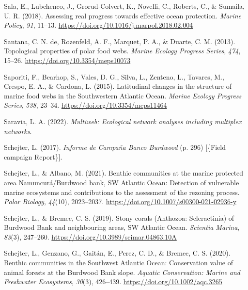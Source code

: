 \documentclass[preprint, 3p,
authoryear]{elsarticle} %
\newlength{\cslhangindent}
\newlength{\cslentryspacingunit} %
\newenvironment{CSLReferences}[2] %
 {%
  \setlength{\parindent}{0pt}
  \ifodd #1
  \let\oldpar\par
  \def\par{\hangindent=\cslhangindent\oldpar}
  \fi
  \setlength{\parskip}{#2\cslentryspacingunit}
 }%
 {}
\begin{document}
\begin{CSLReferences}{1}{0}
\leavevmode{}%
Sala, E., Lubchenco, J., Grorud-Colvert, K., Novelli, C., Roberts, C.,
\& Sumaila, U. R. (2018). Assessing real progress towards effective
ocean protection. \emph{Marine Policy}, \emph{91}, 11--13.
\url{https://doi.org/10.1016/j.marpol.2018.02.004}

\leavevmode{}%
Santana, C. N. de, Rozenfeld, A. F., Marquet, P. A., \& Duarte, C. M.
(2013). Topological properties of polar food webs. \emph{Marine Ecology
Progress Series}, \emph{474}, 15--26.
\url{https://doi.org/10.3354/meps10073}

\leavevmode{}%
Saporiti, F., Bearhop, S., Vales, D. G., Silva, L., Zenteno, L.,
Tavares, M., Crespo, E. A., \& Cardona, L. (2015). Latitudinal changes
in the structure of marine food webs in the {Southwestern Atlantic
Ocean}. \emph{Marine Ecology Progress Series}, \emph{538}, 23--34.
\url{https://doi.org/10.3354/meps11464}

\leavevmode{}%
Saravia, L. A. (2022). \emph{Multiweb: {Ecological} network analyses
including multiplex networks}.

\leavevmode{}%
Schejter, L. (2017). \emph{{Informe de Campaña Banco Burdwood}} (p. 296)
{[}\{Field campaign Report\}{]}.

\leavevmode{}%
Schejter, L., \& Albano, M. (2021). Benthic communities at the marine
protected area {Namuncurá}/{Burdwood} bank, {SW Atlantic Ocean}:
Detection of vulnerable marine ecosystems and contributions to the
assessment of the rezoning process. \emph{Polar Biology}, \emph{44}(10),
2023--2037. \url{https://doi.org/10.1007/s00300-021-02936-y}

\leavevmode{}%
Schejter, L., \& Bremec, C. S. (2019). Stony corals ({Anthozoa}:
{Scleractinia}) of {Burdwood Bank} and neighbouring areas, {SW Atlantic
Ocean}. \emph{Scientia Marina}, \emph{83}(3), 247--260.
\url{https://doi.org/10.3989/scimar.04863.10A}

\leavevmode{}%
Schejter, L., Genzano, G., Gaitán, E., Perez, C. D., \& Bremec, C. S.
(2020). Benthic communities in the {Southwest Atlantic Ocean}:
{Conservation} value of animal forests at the {Burdwood Bank} slope.
\emph{Aquatic Conservation: Marine and Freshwater Ecosystems},
\emph{30}(3), 426--439. \url{https://doi.org/10.1002/aqc.3265}


\end{CSLReferences}
\end{document}
